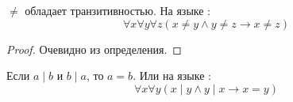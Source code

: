 \documentclass[12pt, a4paper, oneside]{memoir}
\begin{document}
\begin{lemma}
    $\neq$ обладает транзитивностью.
    На языке \FA:
    \begin{equation}
        \forall x \forall y \forall z (x \neq y \land y \neq z \rightarrow x \neq z) \label{lemma4}
    \end{equation}
\end{lemma}
\begin{proof}
    Очевидно из определения.
\end{proof}

\begin{lemma}
    Если $a \mid b$ и $b \mid a$, то $a = b$. Или на языке \FA:
    \begin{equation}
        \forall x \forall y (x \mid y \land y \mid x \rightarrow x = y) \label{lemma5}
    \end{equation}
\end{lemma}
\end{document}

